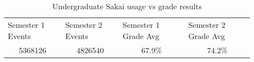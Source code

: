 \begin{table}[]
    \centering
    \caption{Undergraduate Sakai usage vs grade results}
    \label{sakai-grades-and-events}
    \begin{tabular}{llll}
        Semester 1 Events           & Semester 2 Events           & Semester 1 Grade Avg       & Semester 2 Grade Avg       \\
        \multicolumn{1}{c}{5368126} & \multicolumn{1}{c}{4826540} & \multicolumn{1}{c}{67.9\%} & \multicolumn{1}{c}{74.2\%}
    \end{tabular}
\end{table}